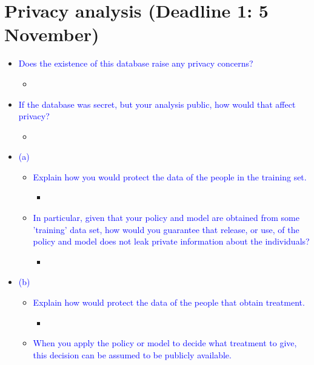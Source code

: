 
\section*{Privacy analysis (Deadline 1: 5 November)}
\begin{itemize}
    \item \textcolor{blue}{Does the existence of this database raise any privacy concerns?}
        \begin{itemize}
            \item 
        \end{itemize}
    \item \textcolor{blue}{If the database was secret, but your analysis public, how would that affect privacy?}
        \begin{itemize}
            \item 
        \end{itemize}
    \item \textcolor{blue}{(a)}
        \begin{itemize}
            \item \textcolor{blue}{Explain how you would protect the data of the people in the training set.}
                \begin{itemize}
                    \item 
                \end{itemize}
            \item \textcolor{blue}{In particular, given that your policy and model are obtained from some 'training' data set, how would you guarantee that release, or use, of the policy and model does not leak private information about the individuals?}
                \begin{itemize}
                    \item 
                \end{itemize}
        \end{itemize}
    \item \textcolor{blue}{(b)}
        \begin{itemize}
            \item \textcolor{blue}{Explain how would protect the data of the people that obtain treatment.}
                \begin{itemize}
                    \item 
                \end{itemize}
            \item \textcolor{blue}{When you apply the policy or model to decide what treatment to give, this decision can be assumed to be publicly available.}

\end{itemize}
\end{itemize}
